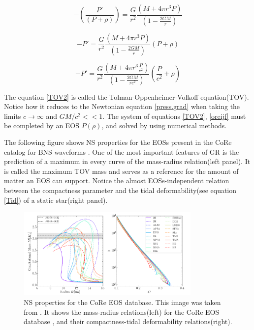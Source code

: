 \begin{equation}
- \left( \frac{P'}{(P+\rho)}\right) = \frac{G}{r^2} \frac{\left( M + 4\pi r^3 P \right)}{\left(  1 - \frac{2GM}{r} \right)}
\end{equation}

\begin{equation}
- P' = \frac{G}{r^2} \frac{\left( M + 4\pi r^3 P \right)}{\left(  1 - \frac{2GM}{r} \right)} (P+\rho)
\end{equation}

\begin{equation}\label{TOV2}
- P' = \frac{G}{r^2} \frac{\left( M + 4\pi r^3 \frac{P}{c^2} \right)}{\left(  1 - \frac{2GM}{r c^2} \right)} \left( \frac{P}{c^2}+\rho \right)
\end{equation}

The equation \ref{TOV2} is called the Tolman-Oppenheimer-Volkoff equation(TOV). Notice how it reduces to the Newtonian equation \ref{press.grad} when taking the limits $c\rightarrow \infty$ and $GM/c^2 <<1$. The system of equations \ref{TOV2}, \ref{oreijf} must be completed by an EOS $P(\rho)$, and solved by using numerical methods.

The following figure shows NS properties for the EOSs present in the CoRe catalog for BNS waveforms \cite{Dietrich:2018phi}. One of the most important features of GR is the prediction of a maximum in every curve of the mass-radius relation(left panel). It is called the maximum TOV mass and serves as a reference for the amount of matter an EOS can support. Notice the almost EOSs-independent relation between the compactness parameter and the tidal deformability(see equation \ref{Tid}) of a static star(right panel). 

\begin{figure}[hbt!]
\begin{center}
\includegraphics[width=0.8\textwidth, angle=0]{images/EOS_TOV.png}
\captionsetup{width=.8\textwidth}
\caption[NS properties for the CoRe EOS database]{NS properties for the CoRe EOS database. This image was taken from \cite{EOSDB}. It shows the mass-radius relations(left) for the CoRe EOS database \cite{Dietrich:2018phi}, and their compactness-tidal deformability relations(right).}
\label{equations of state and tidal deformability}
\end{center}
\end{figure}

